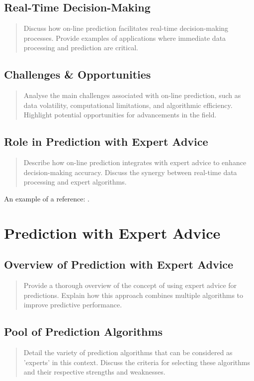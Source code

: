 \documentclass[11pt]{article} %
\theoremstyle{plain}
\theoremstyle{definition}
\begin{document}
\subsection{Real-Time Decision-Making}
\begin{quote}
  Discuss how on-line prediction facilitates real-time decision-making processes. Provide examples of applications where immediate data processing and prediction are critical.
\end{quote}

\subsection{Challenges \& Opportunities}
\begin{quote}
  Analyse the main challenges associated with on-line prediction, such as data volatility, computational limitations, and algorithmic efficiency. Highlight potential opportunities for advancements in the field.
\end{quote}

\subsection{Role in Prediction with Expert Advice}
\begin{quote}
  Describe how on-line prediction integrates with expert advice to enhance decision-making accuracy. Discuss the synergy between real-time data processing and expert algorithms.
\end{quote}

An example of a reference:
\cite{kalnishkan:2022}.
\cite{kalnishkan/vyugin:2008}
\cite{herbster/warmuth:1995}
\cite{vovk:2001}

\newpage

\section{Prediction with Expert Advice}
\subsection{Overview of Prediction with Expert Advice}
\begin{quote}
  Provide a thorough overview of the concept of using expert advice for predictions. Explain how this approach combines multiple algorithms to improve predictive performance.
\end{quote}

\subsection{Pool of Prediction Algorithms}
\begin{quote}
  Detail the variety of prediction algorithms that can be considered as 'experts' in this context. Discuss the criteria for selecting these algorithms and their respective strengths and weaknesses.
\end{quote}
\end{document}
